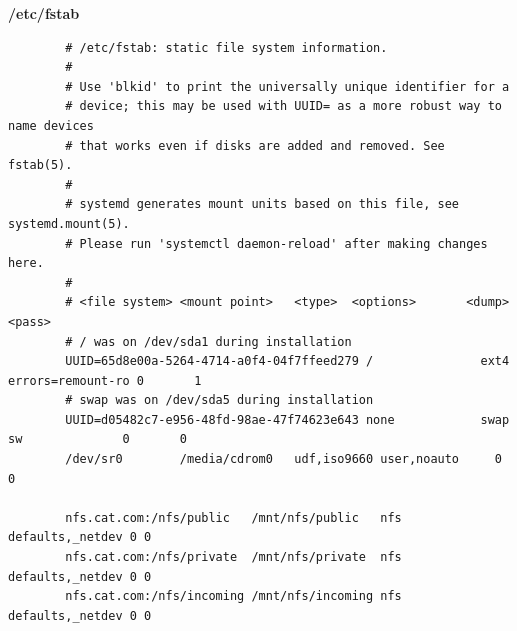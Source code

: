 \documentclass[14pt, a4paper]{extreport}
\begin{document}
	\textbf{/etc/fstab}
	
	\begin{verbatim} 
		# /etc/fstab: static file system information.
		#
		# Use 'blkid' to print the universally unique identifier for a
		# device; this may be used with UUID= as a more robust way to name devices
		# that works even if disks are added and removed. See fstab(5).
		#
		# systemd generates mount units based on this file, see systemd.mount(5).
		# Please run 'systemctl daemon-reload' after making changes here.
		#
		# <file system> <mount point>   <type>  <options>       <dump>  <pass>
		# / was on /dev/sda1 during installation
		UUID=65d8e00a-5264-4714-a0f4-04f7ffeed279 /               ext4    errors=remount-ro 0       1
		# swap was on /dev/sda5 during installation
		UUID=d05482c7-e956-48fd-98ae-47f74623e643 none            swap    sw              0       0
		/dev/sr0        /media/cdrom0   udf,iso9660 user,noauto     0       0
		
		nfs.cat.com:/nfs/public   /mnt/nfs/public   nfs defaults,_netdev 0 0
		nfs.cat.com:/nfs/private  /mnt/nfs/private  nfs defaults,_netdev 0 0
		nfs.cat.com:/nfs/incoming /mnt/nfs/incoming nfs defaults,_netdev 0 0
	\end{verbatim}
\end{document}
